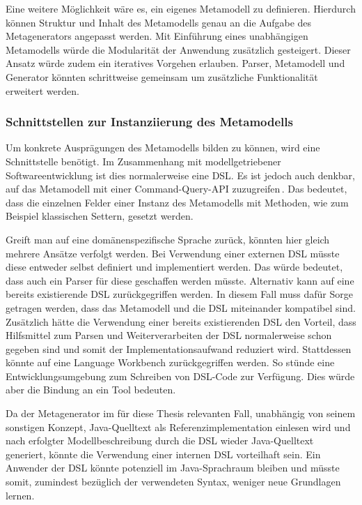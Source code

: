 \documentclass[12pt,oneside,a4paper,parskip]{scrbook}
\begin{document}
Eine weitere Möglichkeit wäre es, ein eigenes Metamodell zu definieren. Hierdurch können Struktur und Inhalt des Metamodells genau an die Aufgabe des Metagenerators angepasst werden. Mit Einführung eines unabhängigen Metamodells würde die Modularität der Anwendung zusätzlich gesteigert. Dieser Ansatz würde zudem ein iteratives Vorgehen erlauben. Parser, Metamodell und Generator könnten schrittweise gemeinsam um zusätzliche Funktionalität erweitert werden.

\subsubsection{Schnittstellen zur Instanziierung des Metamodells}

Um konkrete Ausprägungen des Metamodells bilden zu können, wird eine Schnittstelle benötigt. Im Zusammenhang mit modellgetriebener Softwareentwicklung ist dies normalerweise eine DSL. Es ist jedoch auch denkbar, auf das Metamodell mit einer Command-Query-API zuzugreifen\,\cite[S. 343ff.]{fowler2010}. Das bedeutet, dass die einzelnen Felder einer Instanz des Metamodells mit Methoden, wie zum Beispiel klassischen Settern, gesetzt werden.

Greift man auf eine domänenspezifische Sprache zurück, könnten hier gleich mehrere Ansätze verfolgt werden. Bei Verwendung einer externen DSL müsste diese entweder selbst definiert und implementiert werden. Das würde bedeutet, dass auch ein Parser für diese geschaffen werden müsste. Alternativ kann auf eine bereits existierende DSL zurückgegriffen werden. In diesem Fall muss dafür Sorge getragen werden, dass das Metamodell und die DSL miteinander kompatibel sind. Zusätzlich hätte die Verwendung einer bereits existierenden DSL den Vorteil, dass Hilfsmittel zum Parsen und Weiterverarbeiten der DSL normalerweise schon gegeben sind und somit der Implementationsaufwand reduziert wird. Stattdessen könnte auf eine Language Workbench zurückgegriffen werden. So stünde eine Entwicklungsumgebung zum Schreiben von DSL-Code zur Verfügung. Dies würde aber die Bindung an ein Tool bedeuten.

Da der Metagenerator im für diese Thesis relevanten Fall, unabhängig von seinem sonstigen Konzept, Java-Quelltext als Referenzimplementation einlesen wird und nach erfolgter Modellbeschreibung durch die DSL wieder Java-Quelltext generiert, könnte die Verwendung einer internen DSL vorteilhaft sein. Ein Anwender der DSL könnte potenziell im Java-Sprachraum bleiben und müsste somit, zumindest bezüglich der verwendeten Syntax, weniger neue Grundlagen lernen.
\end{document}
